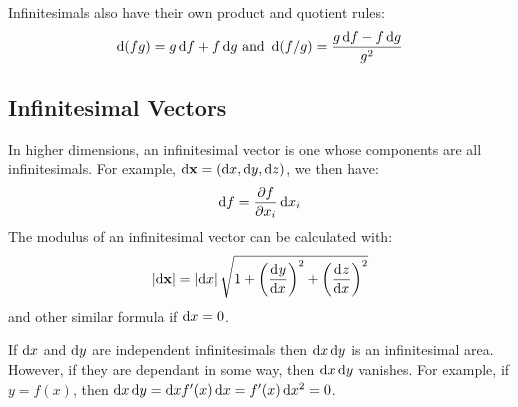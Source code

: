\documentclass[../main.tex]{subfiles}
\begin{document}
Infinitesimals also have their own product and quotient rules:
\[
  \d{(fg)} = g\d{f} + f\d{g} \text{ and } \d{(f/g)} = \frac{g \d{f} - f\d{g}}{g^2}
\]
\subsection{Infinitesimal Vectors}
In higher dimensions, an infinitesimal vector is one whose components are all infinitesimals.
For example, $\d{\vec{x}} = (\d{x}, \d{y}, \d{z})$, we then have:
\begin{equation}
  \d{f} = \pderiv{f}{x_i}\d{x_i} \label{infinitesimalTaylor}
\end{equation}
The modulus of an infinitesimal vector can be calculated with:
\[
  \abs{\d{\vec{x}}} = \abs{\d{x}}\sqrt{1 + \left(\deriv{y}{x}\right)^2 + \left(\deriv{z}{x}\right)^2}
\]
and other similar formula if $\d{x} = 0$.

If $\d{x}$ and $\d{y}$ are independent infinitesimals then $\d{x}\d{y}$ is an infinitesimal area.
However, if they are dependant in some way, then $\d{x}\d{y}$ vanishes.
For example, if $y = f(x)$, then $\d{x}\d{y} = \d{x} f'(x)\d{x} = f'(x) \d{x^2} = 0$.
\end{document}
